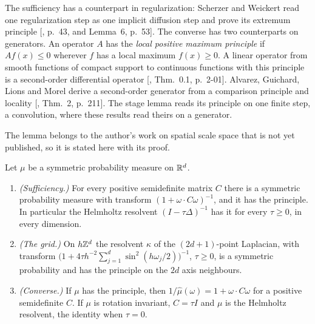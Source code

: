 The sufficiency has a counterpart in regularization: Scherzer and Weickert read one regularization
step as one implicit diffusion step and prove its extremum principle
[, p.~43, and Lemma~6, p.~53]. The converse has two counterparts on
generators. An operator $A$ has the \emph{local positive maximum principle} if $Af(x) \le 0$
wherever $f$ has a local maximum $f(x) \ge 0$. A linear operator from smooth functions of compact
support to continuous functions with this principle is a second-order differential operator
[, Thm.~0.1, p.~2-01]. Alvarez, Guichard, Lions and Morel derive a
second-order generator from a comparison principle and locality
[, Thm.~2, p.~211]. The stage lemma reads its principle on one finite
step, a convolution, where these results read theirs on a generator.

The lemma belongs to the author's work on spatial scale space that is not yet published, so it is
stated here with its proof.

\begin{proposition}
\label{prop:stage-lemma}

Let $\mu$ be a symmetric probability measure on $\mathbb{R}^d$.
\begin{enumerate}
\item \emph{(Sufficiency.)} For every positive semidefinite matrix $C$ there is a symmetric
probability measure with transform $(1 + \omega\cdot C\omega)^{-1}$, and it has the principle. In
particular the Helmholtz resolvent $(I - \tau\Delta)^{-1}$ has it for every $\tau \ge 0$, in every
dimension.
\item \emph{(The grid.)} On $h\mathbb{Z}^d$ the resolvent $\kappa$ of the $(2d+1)$-point Laplacian, with
transform $\bigl(1 + 4\tau h^{-2}\sum_{j=1}^d\sin^2(h\omega_j/2)\bigr)^{-1}$, $\tau \ge 0$, is a
symmetric probability and has the principle on the $2d$ axis neighbours.
\item \emph{(Converse.)} If $\mu$ has the principle, then $1/\widehat\mu(\omega) = 1 + \omega\cdot
C\omega$ for a positive semidefinite $C$. If $\mu$ is rotation invariant, $C = \tau I$ and $\mu$ is
the Helmholtz resolvent, the identity when $\tau = 0$.
\end{enumerate}
\end{proposition}

